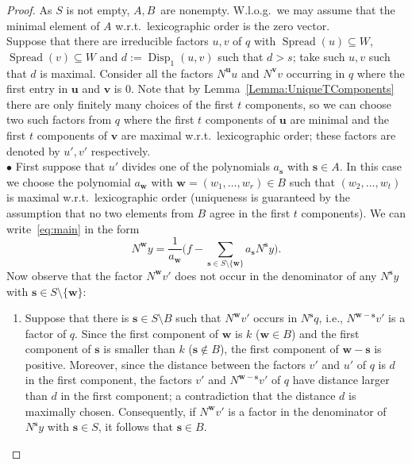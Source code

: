 \documentclass[a4paper]{sig-alternate}
\def\vec#1{\mathbf{#1}}
\def\spread{\operatorname{Spread}}
\def\disp{\operatorname{Disp}}
\begin{document}
\begin{proof}
As $S$ is not empty, $A,B$~are nonempty. W.l.o.g.\ we may assume that the minimal element of $A$ w.r.t.\ lexicographic order is the zero vector.\\
Suppose that there are irreducible factors $u,v$ of $q$ with $\spread(u)\subseteq W$, $\spread(v)\subseteq W$ and $d:=\disp_1(u,v)$ such that $d>s$; take such $u,v$ such that $d$ is maximal.
Consider all the factors $N^{\vec u}u$ and $N^{\vec v}v$ occurring in $q$ where the first entry in $\vec u$ and $\vec v$ is $0$. Note that by Lemma~\ref{Lemma:UniqueTComponents} there are only finitely many choices of the first $t$ components, so we can choose two such factors from $q$ where the first $t$ components of $\vec u$ are minimal and the first $t$ components of $\vec v$ are maximal w.r.t.\ lexicographic order; these factors are denoted by $u',v'$ respectively.\\
$\bullet$ First suppose that $u'$ divides one of the polynomials $a_{\vec{s}}$ with $\vec{s}\in A$.
In this case we choose the polynomial $a_{\vec w}$ with $\vec{w}=(w_1,\dots,w_r)\in B$ such that $(w_2,\dots,w_{t})$ is maximal w.r.t.\ lexicographic order (uniqueness is guaranteed by the assumption that no two elements from $B$ agree in the first $t$ components). We can write~\eqref{eq:main} in the form
\begin{equation}\label{Equ:RewritePLDE}
N^{\vec w}y=\frac{1}{a_{\vec{w}}}\Big(f-\sum_{\vec{s}\in S\setminus\{\vec{w}\}}a_{\vec{s}}N^{\vec{s}}y\Big).
\end{equation}
Now observe that the factor $N^{\vec w}v'$ does not occur in the denominator of any $N^{\vec s}y$ with $\vec s\in S\setminus\{\vec{w}\}$:
\begin{enumerate}
\item Suppose that there is $\vec{s}\in S\setminus B$ such that $N^{\vec w}v'$ occurs in $N^{\vec s}q$, i.e., $N^{\vec w-\vec s}v'$ is a factor of $q$. Since the first component of $\vec{w}$ is $k$ ($\vec w\in B$) and the first component of $\vec{s}$ is smaller than $k$ ($\vec{s}\notin B$), the first component of $\vec w-\vec s$ is positive. Moreover, since the distance between the factors $v'$ and $u'$ of $q$ is $d$ in the first component, the factors $v'$ and $N^{\vec w-\vec s}v'$ of $q$ have distance larger than $d$ in the first component; a contradiction that the distance $d$ is maximally chosen. Consequently, if $N^{\vec w}v'$ is a factor
    in the denominator of $N^{\vec s}y$ with $\vec{s}\in S$, it follows that $\vec{s}\in B$.

\end{enumerate}
\end{proof}
\end{document}
